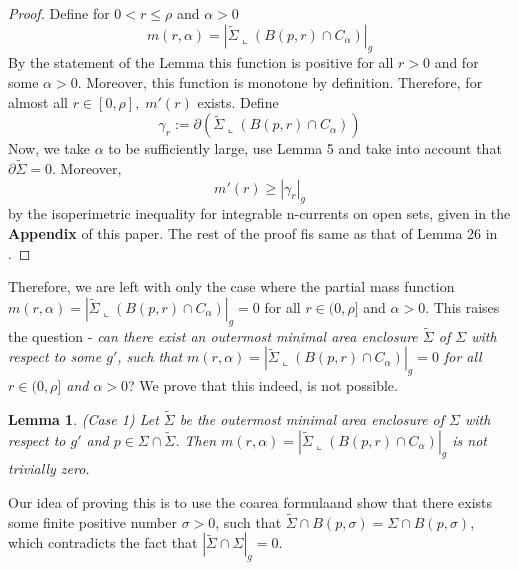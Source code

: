 \documentclass{amsart}
\newcommand{\ts}{\tilde{\Sigma}}
\newtheorem{lemma}{Lemma}
\theoremstyle{named}
\begin{document}
\begin{proof}
    Define for $0 < r \leq \rho$ and $\alpha > 0$
    \begin{equation} \nonumber
        m(r, \alpha) = |\ts \llcorner (B(p,r) \cap C_{\alpha})|_g  
    \end{equation}
    By the statement of the Lemma this function is positive for all $r > 0$ and for some $\alpha > 0$. Moreover, this function is monotone by definition. Therefore, for almost all $r \in [0,\rho], \; m'(r)$ exists. Define
    \begin{equation} \nonumber
        \gamma_r := \partial (\ts \llcorner (B(p,r) \cap C_{\alpha}))
    \end{equation}
    Now, we take $\alpha$ to be sufficiently large, use Lemma 5 and take into account that $\partial \ts = 0$. Moreover,
    \begin{equation} \nonumber
        m'(r) \geq |\gamma_r|_g
    \end{equation}
    by the isoperimetric inequality for integrable n-currents on open sets, given in the \textbf{Appendix} of this paper. 
    The rest of the proof fis same as that of Lemma 26 in \cite{jeff}.
\end{proof}

Therefore, we are left with only the case where the partial mass function $m(r,\alpha) = |\ts \llcorner (B(p,r) \cap C_{\alpha})|_g = 0$ for all $r \in (0,\rho]$ and $\alpha > 0$. This raises the question - \textit{can there exist an outermost minimal area enclosure $\tilde{\Sigma}$ of $\Sigma$ with respect to some $g'$, such that $m(r,\alpha) = |\tilde{\Sigma} \llcorner (B(p,r) \cap C_{\alpha})|_g = 0$ for all $r \in (0,\rho]$ and $\alpha > 0$}? We prove that this indeed, is not possible.

\begin{lemma} \label{lemma: zeropardensity_meq0} (Case 1)
    Let $\ts$ be the outermost minimal area enclosure of $\Sigma$ with respect to $g'$ and $p \in \Sigma \cap \ts$. Then $m(r,\alpha) = |\tilde{\Sigma} \llcorner (B(p,r) \cap C_{\alpha})|_g$ is not trivially zero. 
\end{lemma}

Our idea of proving this is to use the coarea formulaand show that there exists some finite positive number $\sigma > 0$, such that $\ts \cap B(p,\sigma) = \Sigma \cap B(p,\sigma)$, which contradicts the fact that $|\ts \cap \Sigma|_g = 0$. 
\end{document}
